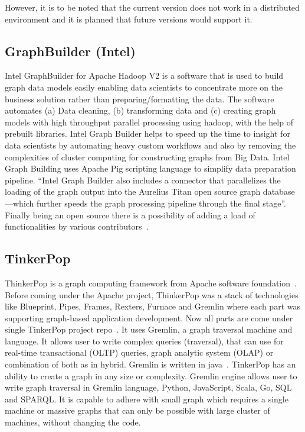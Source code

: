     However, it is to be noted that the current version does not work
    in a distributed environment and it is planned that future
    versions would support it.
    
\subsection{GraphBuilder (Intel)}

Intel GraphBuilder for Apache Hadoop V2 is a software that is used to
build graph data models easily enabling data scientists to concentrate
more on the business solution rather than preparing/formatting the
data. The software automates (a) Data cleaning, (b) transforming data and
(c) creating graph models with high throughput parallel processing using
hadoop, with the help of prebuilt libraries. Intel Graph Builder helps
to speed up the time to insight for data scientists by automating
heavy custom workflows and also by removing the complexities of
cluster computing for constructing graphs from Big Data. Intel Graph
Building uses Apache Pig scripting language to simplify data
preparation pipeline.  ``Intel Graph Builder also includes a connector
that parallelizes the loading of the graph output into the Aurelius
Titan open source graph database—which further speeds the graph
processing pipeline through the final stage''.  Finally being an open
source there is a possibility of adding a load of functionalities by
various contributors~\cite{graphbuilder}.

    
\subsection{TinkerPop}
    
ThinkerPop is a graph computing framework from Apache software
foundation~\cite{www-ApacheTinkerPop}. Before coming under the Apache
project, ThinkerPop was a stack of technologies like Blueprint, Pipes,
Frames, Rexters, Furnace and Gremlin where each part was supporting
graph-based application development. Now all parts are come under
single TinkerPop project repo~\cite{www-news}. It uses Gremlin, a
graph traversal machine and language. It allows user to write complex
queries (traversal), that can use for real-time transactional (OLTP)
queries, graph analytic system (OLAP) or combination of both as in
hybrid. Gremlin is written in
java~\cite{www-ApacheTinkerPopHome}. TinkerPop has an ability to
create a graph in any size or complexity. Gremlin engine allows user
to write graph traversal in Gremlin language, Python, JavaScript,
Scala, Go, SQL and SPARQL. It is capable to adhere with small graph
which requires a single machine or massive graphs that can only be
possible with large cluster of machines, without changing the code.

